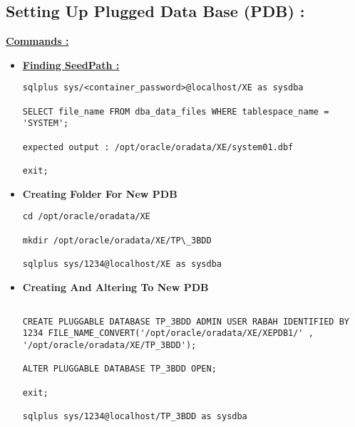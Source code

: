 \documentclass{article}
\begin{document}
\subsection{Setting Up Plugged Data Base (PDB) : }
\begin{tcolorbox}

\textbf{\underline{Commands :}}
\begin{itemize}
    \item  \textbf{\underline{Finding SeedPath : }}
\begin{verbatim}
sqlplus sys/<container_password>@localhost/XE as sysdba

SELECT file_name FROM dba_data_files WHERE tablespace_name = 'SYSTEM';

expected output : /opt/oracle/oradata/XE/system01.dbf

exit;
\end{verbatim}
\item  \textbf{Creating Folder For New PDB}

\begin{verbatim}
cd /opt/oracle/oradata/XE

mkdir /opt/oracle/oradata/XE/TP\_3BDD

sqlplus sys/1234@localhost/XE as sysdba

\end{verbatim}
\item \textbf{Creating And Altering To New PDB}
\begin{verbatim}

CREATE PLUGGABLE DATABASE TP_3BDD ADMIN USER RABAH IDENTIFIED BY 1234 FILE_NAME_CONVERT('/opt/oracle/oradata/XE/XEPDB1/' , '/opt/oracle/oradata/XE/TP_3BDD');

ALTER PLUGGABLE DATABASE TP_3BDD OPEN;

exit;

sqlplus sys/1234@localhost/TP_3BDD as sysdba

\end{verbatim}
\end{itemize}
\end{tcolorbox}
\end{document}
